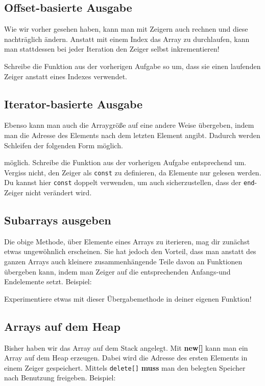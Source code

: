 \subsection{Offset-basierte Ausgabe}
Wie wir vorher gesehen haben, kann man mit Zeigern auch rechnen und diese nachträglich ändern.
Anstatt mit einem Index das Array zu durchlaufen, kann man stattdessen bei jeder Iteration den Zeiger selbst inkrementieren!


Schreibe die Funktion aus der vorherigen Aufgabe so um, dass sie einen laufenden Zeiger anstatt eines Indexes verwendet.

\subsection{Iterator-basierte Ausgabe}
Ebenso kann man auch die Arraygröße auf eine andere Weise übergeben, indem man die Adresse des Elements nach dem letzten Element angibt.
Dadurch werden Schleifen der folgenden Form möglich.


möglich.
Schreibe die Funktion aus der vorherigen Aufgabe entsprechend um.
Vergiss nicht, den Zeiger als \lstinline{const} zu definieren, da Elemente nur gelesen werden.
Du kannst hier \lstinline{const} doppelt verwenden, um auch sicherzustellen, dass der \lstinline{end}-Zeiger nicht verändert wird.

\subsection{Subarrays ausgeben}
Die obige Methode, über Elemente eines Arrays zu iterieren, mag dir zunächst etwas ungewöhnlich erscheinen.
Sie hat jedoch den Vorteil, dass man anstatt des ganzen Arrays auch kleinere zusammenhängende Teile davon an Funktionen übergeben kann, indem man Zeiger auf die entsprechenden Anfangs-und Endelemente setzt.
Beispiel:


Experimentiere etwas mit dieser Übergabemethode in deiner eigenen Funktion!

\subsection{Arrays auf dem Heap}
Bisher haben wir das Array auf dem Stack angelegt.
Mit \textbf{new[]} kann man ein Array auf dem Heap erzeugen.
Dabei wird die Adresse des ersten Elements in einem Zeiger gespeichert.
Mittels \lstinline{delete[]} \textbf{muss} man den belegten Speicher nach Benutzung freigeben.
Beispiel:

